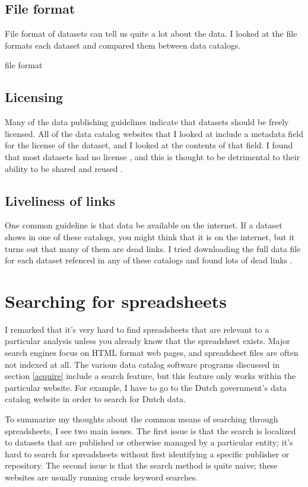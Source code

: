 \documentclass{acm_proc_article-sp}
\begin{document}
\subsection{File format}
File format of datasets can tell us quite a lot about the data. I looked at the
file formats each dataset and compared them between data catalogs.

file format \cite{file-formats}

\subsection{Licensing}
Many of the data publishing guidelines indicate that datasets should be freely
licensed. All of the data catalog websites that I looked at include a metadata
field for the license of the dataset, and I looked at the contents of that field.
I found that most datasets had no license \cite{licensing}, and this is thought
to be detrimental to their ability to be shared and reused
\cite{open-data-census,fivestars,sunlight,sebastopol,odi}.

\subsection{Liveliness of links}
One common guideline is that data be available on the internet. If a dataset
shows in one of these catalogs, you might think that it is on the internet,
but it turns out that many of them are dead links. I tried downloading the
full data file for each dataset refenced in any of these catalogs and found
lots of dead links \cite{dead,zombie}.








\section{Searching for spreadsheets}
I remarked that it's very hard to find spreadsheets that are relevant
to a particular analysis unless you already know that the spreadsheet exists.
Major search engines focus on HTML format web pages, and spreadsheet files
are often not indexed at all. The various data catalog software programs
discussed in section \ref{acquire} include a search feature, but this feature
only works within the particular website. For example, I have to go to the
Dutch government's data catalog website in order to search for Dutch data.

To summarize my thoughts about the common means of searching through
spreadsheets, I see two main issues.
The first issue is that the search is localized to datasets that are published
or otherwise managed by a particular entity; it's hard to search for
spreadsheets without first identifying a specific publisher or repository.
The second issue is that the search method is quite naive; these websites are
usually running crude keyword searches.
\end{document}
